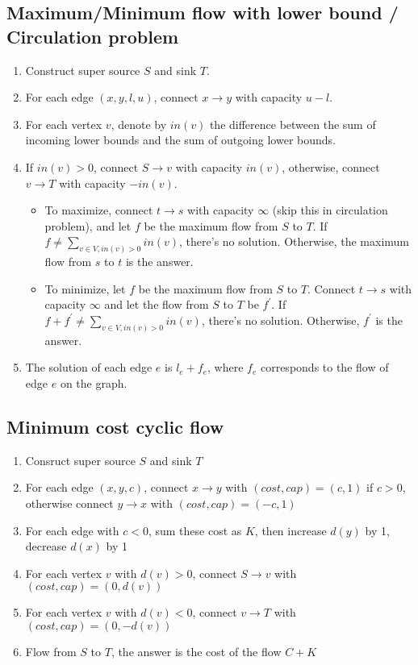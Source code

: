 \subsection{Maximum/Minimum flow with lower bound / Circulation problem}
\vspace{-0.2em}
\begin{enumerate}
	\itemsep-0.8em
	\item Construct super source $S$ and sink $T$.
	\item For each edge $(x, y, l, u)$, connect $x \rightarrow y$ with capacity $u - l$.
	\item For each vertex $v$, denote by $in(v)$ the difference between the sum of incoming lower bounds and the sum of outgoing lower bounds.
	\item If $in(v) > 0$, connect $S \rightarrow v$ with capacity $in(v)$, otherwise, connect $v \rightarrow T$ with capacity $-in(v)$.
	\begin{itemize}
		\itemsep-0.3em
		\item To maximize, connect $t \rightarrow s$ with capacity $\infty$ (skip this in circulation problem), and let $f$ be the maximum flow from $S$ to $T$. If $f \neq \sum_{v \in V, in(v) > 0}{in(v)}$, there's no solution. Otherwise, the maximum flow from $s$ to $t$ is the answer.
		\item To minimize, let $f$ be the maximum flow from $S$ to $T$. Connect $t \rightarrow s$ with capacity $\infty$ and let the flow from $S$ to $T$ be $f^\prime$. If $f + f^\prime \neq \sum_{v \in V, in(v) > 0}{in(v)}$, there's no solution. Otherwise, $f^\prime$ is the answer.
	\end{itemize}
	\item The solution of each edge $e$ is $l_e + f_e$, where $f_e$ corresponds to the flow of edge $e$ on the graph.
\end{enumerate}

\subsection{Minimum cost cyclic flow}
\vspace{-0.2em}
\begin{enumerate}
	\itemsep-0.8em
	\item Consruct super source $S$ and sink $T$
	\item For each edge $(x, y, c)$, connect $x \rightarrow y$ with $(cost, cap) = (c, 1)$ if $c > 0$, otherwise connect $y \rightarrow x$ with $(cost, cap) = (-c, 1)$
	\item For each edge with $c < 0$, sum these cost as $K$, then increase $d(y)$ by 1, decrease $d(x)$ by 1
	\item For each vertex $v$ with $d(v) > 0$, connect $S \rightarrow v$ with $(cost, cap) = (0, d(v))$
	\item For each vertex $v$ with $d(v) < 0$, connect $v \rightarrow T$ with $(cost, cap) = (0, -d(v))$
	\item Flow from $S$ to $T$, the answer is the cost of the flow $C + K$
\end{enumerate}

